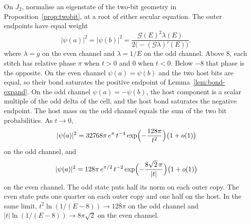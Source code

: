 \begin{proposition}
\label{prop:bitwt}
On \(J_2\), normalise an eigenstate of the two-bit geometry in
Proposition~\ref{prop:twobit}, at a root of either secular equation.
The outer endpoints have equal weight
\begin{equation}
\label{eq:bitwt}
|\psi(a)|^2=|\psi(b)|^2
=\frac{\mathcal{G}(E)^2\lambda(E)}
{2\bigl(-(\mathcal{G}\lambda)'(E)\bigr)},
\end{equation}
where \(\lambda=g\) on the even channel and \(\lambda=1/E\) on the odd
channel.
Above \(8\), each stitch has relative phase \(\pi\) when \(t>0\) and \(0\)
when \(t<0\).
Below \(-8\) that phase is the opposite.
On the even channel \(\psi(a)=\psi(b)\) and the two host bits are equal, so
their bond saturates the positive endpoint of
Lemma~\ref{lem:bond-expand}.
On the odd channel \(\psi(a)=-\psi(b)\), the host component is a scalar
multiple of the odd delta of the cell, and the host bond saturates the
negative endpoint.
The host mass on the odd channel equals the sum of the two bit
probabilities.
As \(t\to 0\),
\begin{equation}
\label{eq:bitodd}
|\psi(a)|^2
=32768\pi\, e^{\pi}\, t^{-4}
\exp\Bigl(-\frac{128\pi}{t^2}\Bigr)
\bigl(1+o(1)\bigr)
\end{equation}
on the odd channel, and
\begin{equation}
\label{eq:biteven}
|\psi(a)|^2
=128\pi\, e^{\pi/2}\, t^{-2}
\exp\Bigl(-\frac{8\sqrt{2}\,\pi}{|t|}\Bigr)
\bigl(1+o(1)\bigr)
\end{equation}
on the even channel.
The odd state puts half its norm on each outer copy.
The even state puts one quarter on each outer copy and one half on the
host.
In the same limit,
\(t^2\ln(1/(E-8))\to 128\pi\) on the odd channel and
\(|t|\ln(1/(E-8))\to 8\pi\sqrt{2}\) on the even channel.
\end{proposition}

